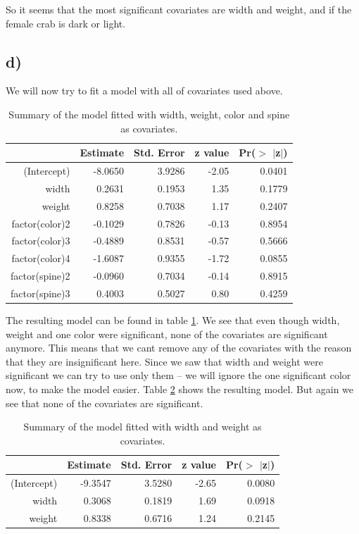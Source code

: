 \documentclass[a4paper,norsk, 10pt]{article}
\begin{document}
So it seems that the most significant covariates are width and weight, and if the female crab is dark or light. 


\subsection{d)}

We will now try to fit a model with all of covariates used above.

\begin{table}[!htb]
\centering
\begin{tabular}{rrrrr}
  \hline
 & Estimate & Std. Error & z value & Pr($>$ $|$z$|$) \\ 
  \hline
(Intercept) & -8.0650 & 3.9286 & -2.05 & 0.0401 \\ 
  width & 0.2631 & 0.1953 & 1.35 & 0.1779 \\ 
  weight & 0.8258 & 0.7038 & 1.17 & 0.2407 \\ 
  factor(color)2 & -0.1029 & 0.7826 & -0.13 & 0.8954 \\ 
  factor(color)3 & -0.4889 & 0.8531 & -0.57 & 0.5666 \\ 
  factor(color)4 & -1.6087 & 0.9355 & -1.72 & 0.0855 \\ 
  factor(spine)2 & -0.0960 & 0.7034 & -0.14 & 0.8915 \\ 
  factor(spine)3 & 0.4003 & 0.5027 & 0.80 & 0.4259 \\ 
   \hline
\end{tabular}
\caption{Summary of the model fitted with width, weight, color and spine as covariates.}\label{tab:crabs_all}
\end{table}

The resulting model can be found in table \ref{tab:crabs_all}. We see that even though width, weight and one color were significant, none of the covariates are significant anymore. This means that we cant remove any of the covariates with the reason that they are insignificant here. Since we saw that width and weight were significant we can try to use only them -- we will ignore the one significant color now, to make the model easier. Table \ref{tab:crabs_width_weight} shows the resulting model. But again we see that none of the covariates are significant. 

\begin{table}[!htb]
\centering
\begin{tabular}{rrrrr}
  \hline
 & Estimate & Std. Error & z value & Pr($>$ $|$z$|$) \\ 
  \hline
(Intercept) & -9.3547 & 3.5280 & -2.65 & 0.0080 \\ 
  width & 0.3068 & 0.1819 & 1.69 & 0.0918 \\ 
  weight & 0.8338 & 0.6716 & 1.24 & 0.2145 \\ 
   \hline
\end{tabular}
\caption{Summary of the model fitted with width and weight as covariates.}\label{tab:crabs_width_weight}
\end{table}
\end{document}
